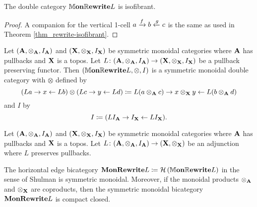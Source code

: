 \documentclass[ master_reopn ]{subfiles}
\begin{document}
\begin{thm} \label{thm_mon-rewrite-isofibrant}
	The double category $ \mathbb{M}\mathbf{on}\mathbb{R}\mathbf{ewrite}{L} $ is isofibrant.
\end{thm}
\begin{proof}
	A companion for the vertical 1-cell $ a \xrightarrow{f} b \xleftarrow{g} c $ is the same as used in Theorem \ref{thm_rewrite-isofibrant}.  
	
\end{proof}

\begin{thm} \label{thm_mon-rewrite-dble-cat-smc}
	Let $ (\mathbf{A}, \otimes_{ \mathbf{A} }, I_{ \mathbf{A} }) $ and $ (\mathbf{X}, \otimes_{\mathbf{X}}, I_{\mathbf{X}}) $ be symmetric monoidal categories where $ \mathbf{A} $ has pullbacks and $ \mathbf{X} $ is a topos. Let $ L \colon (\mathbf{A}, \otimes_{ \mathbf{A} }, I_{ \mathbf{A} }) \to (\mathbf{X}, \otimes_{\mathbf{X}}, I_{\mathbf{X}}) $ be a pullback preserving functor. Then $ (\mathbb{M}\mathbf{on}\mathbb{R}\mathbf{ewrite}{L} , \otimes , I) $ is a symmetric monoidal double category with $ \otimes $ defined by
	\[
	\left( L a \to x \gets L b \right) \otimes
	\left( L c \to y \gets L d	\right) \coloneqq
	L (a \otimes_{\mathbf{A}} c) \to 
	x \otimes_{\mathbf{X}} y \gets L (b \otimes_{\mathbf{A}} d)
	\]
	and $ I $ by
	\[
	I \coloneqq ( L I_{\mathbf{A}} \to I_{\mathbf{X}} \gets L I_{\mathbf{X}} ).
	\]
\end{thm}

\begin{thm} \label{thm_mon-rewrite-cat-compact-closed}
	Let $ (\mathbf{A}, \otimes_{ \mathbf{A} }, I_{ \mathbf{A} }) $ and $ (\mathbf{X}, \otimes_{\mathbf{X}}, I_{\mathbf{X}}) $ be symmetric monoidal categories where $ \mathbf{A} $ has pullbacks and $ \mathbf{X} $ is a topos. Let $ L \colon (\mathbf{A}, \otimes_{ \mathbf{A} }, I_{ \mathbf{A} }) \to (\mathbf{X}, \otimes_{\mathbf{X}}) $ be an adjunction where $ L $ preserves pullbacks.
	
	The horizontal edge bicategory $ \mathbf{MonRewrite}{L} \coloneqq  \mathcal{H} \left( \mathbb{M}\mathbf{on}\mathbb{R}\mathbf{ewrite}{L} \right) $ in the sense of Shulman is symmetric monoidal.  Moreover, if the monoidal products $ \otimes_{\mathbf{A}} $ and $ \otimes_{\mathbf{X}} $ are coproducts, then the symmetric monoidal bicategory $ \mathbf{MonRewrite}{L} $ is compact closed.
\end{thm}
\end{document}
